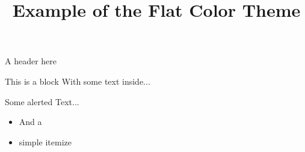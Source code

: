 \documentclass[12pt,a4paper]{beamer}
\title{Example of the Flat Color Theme}
\begin{document}
	\begin{frame}{}
		\maketitle
	\end{frame}
	\begin{frame}{A header here}
		\begin{block}{This is a block}
			With some text inside...
		\end{block}
		\alert{Some alerted Text...}
		\begin{itemize}
			\item And a
			\item simple itemize
		\end{itemize}
	\end{frame}
\end{document}

